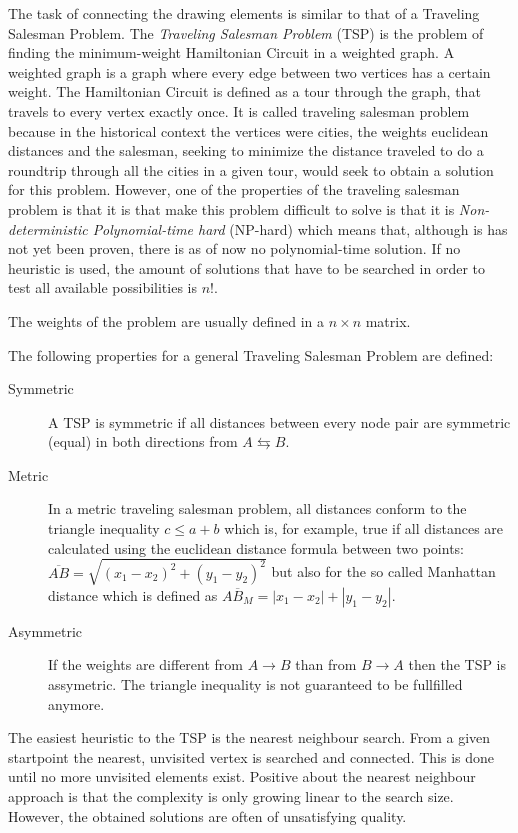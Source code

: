 The task of connecting the drawing elements is similar to that of a Traveling Salesman Problem.
The \textit{Traveling Salesman Problem} (TSP) is the problem of finding the minimum-weight Hamiltonian Circuit in a weighted graph. A weighted graph is a graph where every edge between two vertices has a certain weight. The Hamiltonian Circuit is defined as a tour through the graph, that travels to every vertex exactly once. It is called traveling salesman problem because in the historical context the vertices were cities, the weights euclidean distances and the salesman, seeking to minimize the distance traveled to do a roundtrip through all the cities in a given tour, would seek to obtain a solution for this problem. However, one of the properties of the traveling salesman problem is that it is that make this problem difficult to solve is that it is \textit{Non-deterministic Polynomial-time hard} (NP-hard) which means that, although is has not yet been proven, there is as of now no polynomial-time solution. If no heuristic is used, the amount of solutions that have to be searched in order to test all available possibilities is $n!$.

The weights of the problem are usually defined in a  $n \times n$ matrix.

The following properties for a general Traveling Salesman Problem are defined:

\begin{description}
\item[Symmetric] A TSP is symmetric if all distances between every node pair are symmetric (equal) in both directions from $A \leftrightarrows B$.
\item[Metric] In a metric traveling salesman problem, all distances conform to the triangle inequality $c \leq a + b$ which is, for example, true if all distances are calculated using the euclidean distance formula between two points: $\overline{AB} = \sqrt{(x_1 -x_2)^2 + (y_1 - y_2)^2}$ but also for the so called Manhattan distance which is defined as $\overline{AB_M} = |x_1-x_2| + |y_1 - y_2|$.
\item[Asymmetric] If the weights are different from $A \rightarrow B$ than from $B \rightarrow A$ then the TSP is assymetric. The triangle inequality is not guaranteed to be fullfilled anymore.
\end{description}

The easiest heuristic to the TSP is the nearest neighbour search. From a given startpoint the nearest, unvisited vertex is searched and connected. This is done until no more unvisited elements exist. Positive about the nearest neighbour approach is that the complexity is only growing linear to the search size. However, the obtained solutions are often of unsatisfying quality.

